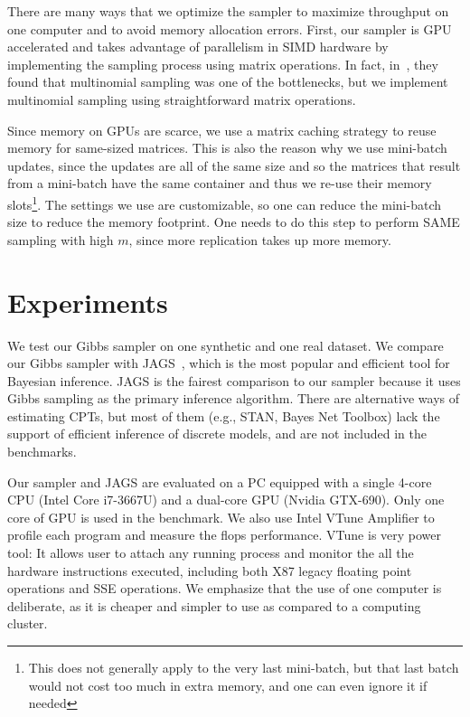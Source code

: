 \documentclass{article} %
\begin{document}
There are many ways that we optimize the sampler to maximize throughput on one computer and to avoid
memory allocation errors. First, our sampler is GPU accelerated and takes advantage of parallelism
in SIMD hardware by implementing the sampling process using matrix operations. In fact,
in~\citep{SAME2015}, they found that multinomial sampling was one of the bottlenecks, but we
implement multinomial sampling using straightforward matrix operations.

Since memory on GPUs are scarce, we use a matrix caching strategy to reuse memory for same-sized
matrices. This is also the reason why we use mini-batch updates, since the updates are all of the
same size and so the matrices that result from a mini-batch have the same container and thus we
re-use their memory slots\footnote{This does not generally apply to the very last mini-batch, but
that last batch would not cost too much in extra memory, and one can even ignore it if needed}. The
settings we use are customizable, so one can reduce the mini-batch size to reduce the memory
footprint. One needs to do this step to perform SAME sampling with high $m$, since more replication
takes up more memory.




\section{Experiments}\label{sec:experiments}

We test our Gibbs sampler on one synthetic and one real dataset.  We compare our Gibbs sampler with
JAGS~\citep{JAGS2003}, which is the most popular and efficient tool for Bayesian inference. JAGS is
the fairest comparison to our sampler because it uses Gibbs sampling as the primary inference
algorithm. There are alternative ways of estimating CPTs, but most of them (e.g., STAN, Bayes Net
Toolbox) lack the support of efficient inference of discrete models, and are not included in the
benchmarks.

Our sampler and JAGS are evaluated on a PC equipped with a single 4-core CPU (Intel Core i7-3667U)
and a dual-core GPU (Nvidia GTX-690). Only one core of GPU is used in the benchmark. We also use
Intel VTune Amplifier to profile each program and measure the flops performance. VTune is very power
tool: It allows user to attach any running process and monitor the all the hardware instructions
executed, including both X87 legacy floating point operations and SSE operations.  We emphasize that
the use of one computer is deliberate, as it is cheaper and simpler to use as compared to a
computing cluster.
\end{document}
